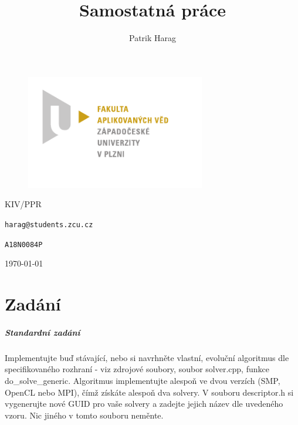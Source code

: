 \documentclass[12pt, a4paper]{report}
\title{Samostatná práce}
\author{Patrik Harag}
\makeatletter
\def \thesubtitle {KIV/PPR}
\def \theauthoremail {harag@students.zcu.cz}
\def \theauthorid {A18N0084P}
\makeatother
\begin{document}
\begin{titlepage}
	\begin{figure}
		\includegraphics[height=50mm]{img-fav-logo}
	\end{figure}
	
	\centering
	{\large \hspace{1mm} \par} %
	\vspace{15ex}
	
	{\huge\bfseries \thetitle \par}
	\vspace{2ex}
	{\scshape\Large \thesubtitle \par}
	\vspace{15ex}
	{\Large\itshape \theauthor \par}
	\vspace{2ex}
	{\texttt{\theauthoremail} \par}
	\vspace{1ex}
	{\texttt{\theauthorid} \par}
	
	\vfill

	{\today\par}
\end{titlepage}

\chapter{Zadání}
\paragraph{Standardní zadání}
Implementujte buď stávající, nebo si navrhněte vlastní, evoluční algoritmus dle specifikovaného rozhraní - viz zdrojové soubory, soubor solver.cpp, funkce do\_solve\_generic. Algoritmus implementujte alespoň ve dvou verzích (SMP, OpenCL nebo MPI), čímž získáte alespoň dva solvery. V souboru descriptor.h si vygenerujte nové GUID pro vaše solvery a zadejte jejich název dle uvedeného vzoru. Nic jiného v tomto souboru neměnte.
\end{document}
